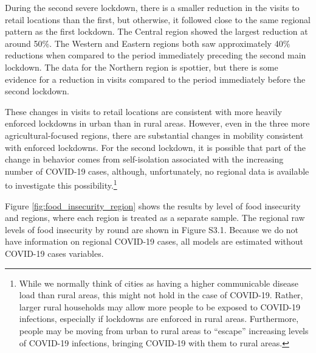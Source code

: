 \documentclass{wber}
\begin{document}
During the second severe lockdown, there is a smaller reduction in the
visits to retail locations than the first, but otherwise, it followed
close to the same regional pattern as the first lockdown. The Central
region showed the largest reduction at around 50\%. The Western and
Eastern regions both saw approximately 40\% reductions when compared to
the period immediately preceding the second main lockdown. The data for
the Northern region is spottier, but there is some evidence for a
reduction in visits compared to the period immediately before the second
lockdown.

These changes in visits to retail locations are consistent with more
heavily enforced lockdowns in urban than in rural areas. However, even
in the three more agricultural-focused regions, there are substantial
changes in mobility consistent with enforced lockdowns. For the second
lockdown, it is possible that part of the change in behavior comes from
self-isolation associated with the increasing number of COVID-19 cases,
although, unfortunately, no regional data is available to investigate
this possibility.\footnote{While we normally think of cities as having a
  higher communicable disease load than rural areas, this might not hold
  in the case of COVID-19. Rather, larger rural households may allow
  more people to be exposed to COVID-19 infections, especially if
  lockdowns are enforced in rural areas. Furthermore, people may be
  moving from urban to rural areas to ``escape'' increasing levels of
  COVID-19 infections, bringing COVID-19 with them to rural areas.}

Figure \ref{fig:food_insecurity_region} shows the results by level of food
insecurity and regions, where each region is treated as a separate
sample. The regional raw levels of food insecurity by round are shown in
Figure S3.1. Because we do not have information on regional COVID-19 cases, 
all models are estimated without COVID-19 cases variables.
\end{document}
